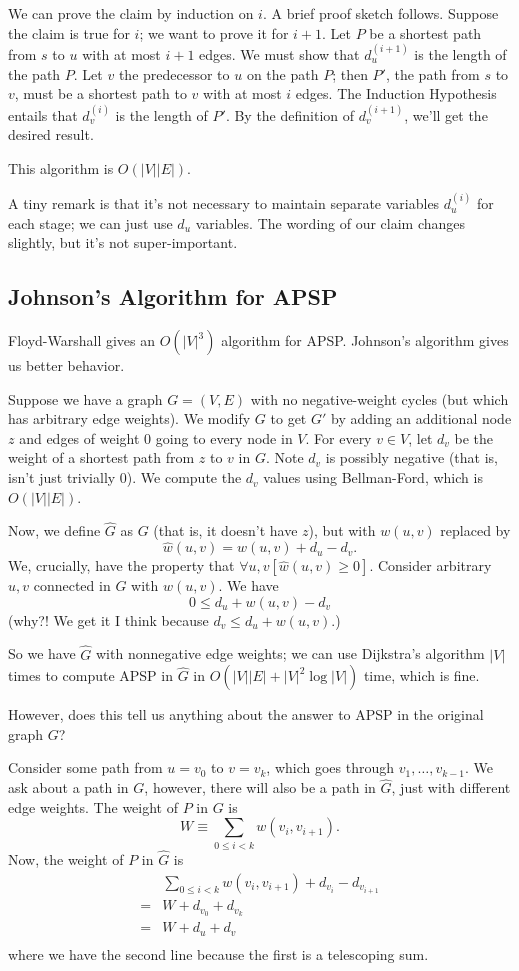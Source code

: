 \documentclass{article}
\begin{document}
We can prove the claim by induction on $i$.
A brief proof sketch follows.
Suppose the claim is true for $i$; we want to prove it for $i+1$.
Let $P$ be a shortest path from $s$ to $u$ with at most $i+1$ edges.
We must show that $d_u^{(i+1)}$ is the length of the path $P$.
Let $v$ the predecessor to $u$ on the path $P$; then $P'$, the
path from $s$ to $v$, must be a shortest path to $v$ with at most
$i$ edges.
The Induction Hypothesis entails that $d_v^{(i)}$ is the length of $P'$.
By the definition of $d_v^{(i+1)}$, we'll get the desired result.

This algorithm is $O(|V| |E|)$.

A tiny remark is that it's not necessary to maintain separate variables
$d_u^{(i)}$ for each stage; we can just use $d_u$ variables.
The wording of our claim changes slightly, but it's not super-important.

\subsection{Johnson's Algorithm for APSP}

Floyd-Warshall gives an $O(|V|^3)$ algorithm for APSP.
Johnson's algorithm gives us better behavior.

Suppose we have a graph $G = (V,E)$ with no negative-weight cycles (but which 
has arbitrary edge weights).
We modify $G$ to get $G'$ by adding an additional node $z$ and edges of
weight $0$ going to every node in $V$.
For every $v\in V$, let $d_v$ be the weight of a shortest path from $z$ to $v$
in $G$.
Note $d_v$ is possibly negative (that is, isn't just trivially 0).
We compute the $d_v$ values using Bellman-Ford, which is $O(|V| |E|)$.

Now, we define $\widehat G$ as $G$ (that is, it doesn't have $z$), but with
$w(u,v)$ replaced by
$$
\widehat w(u,v) = w(u,v) + d_u - d_v.
$$
We, crucially, have the property that $\forall u,v[\widehat w(u,v) \geq 0]$.
Consider arbitrary $u,v$ connected in $G$ with $w(u,v)$.
We have
$$
0 \leq d_u + w(u, v) - d_v
$$
(why?! We get it I think because $d_v \leq d_u + w(u,v)$.)

So we have $\widehat G$ with nonnegative edge weights; we can use Dijkstra's
algorithm $|V|$ times to compute APSP in $\widehat G$ in
$ O(|V|  |E| + |V|^2\log |V|)$
time, which is fine.

However, does this tell us anything about the answer to APSP in the original
graph $G$?

Consider some path from $u = v_0$ to $v = v_k$, which goes through
$v_1, \ldots, v_{k-1}$.
We ask about a path in $G$, however, there will also be a path in $\widehat G$,
just with different edge weights.
The weight of $P$ in $G$ is 
$$
W \equiv
\sum_{0\leq i < k}
w(v_i, v_{i+1}).
$$
Now, the weight of $P$ in $\widehat G$ is
\begin{align*}
& \sum_{0\leq i < k} w(v_i, v_{i+1}) + d_{v_i} - d_{v_{i+1}} \\
= & W + d_{v_0} + d_{v_k} \\
= & W + d_{u} + d_{v} \\
\end{align*}
where we have the second line because the first is a telescoping sum.
\end{document}
